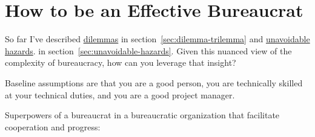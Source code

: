 \section{How to be an Effective Bureaucrat\label{sec:effective-bureaucrat}}

So far I've described 
\hyperref[sec:dilemma-trilemma]{dilemmas} 
\ifsectionref
in section~\ref{sec:dilemma-trilemma} 
\fi
and 
\hyperref[sec:unavoidable-hazards]{unavoidable hazards}.
\ifsectionref
in section~\ref{sec:unavoidable-hazards}. 
\fi
Given this nuanced view of the complexity of bureaucracy, how can you leverage that insight?

Baseline assumptions are that you are a good person, you are technically skilled at your technical duties, and you are a good project manager. 


Superpowers of a bureaucrat in a bureaucratic organization that facilitate cooperation and progress:

